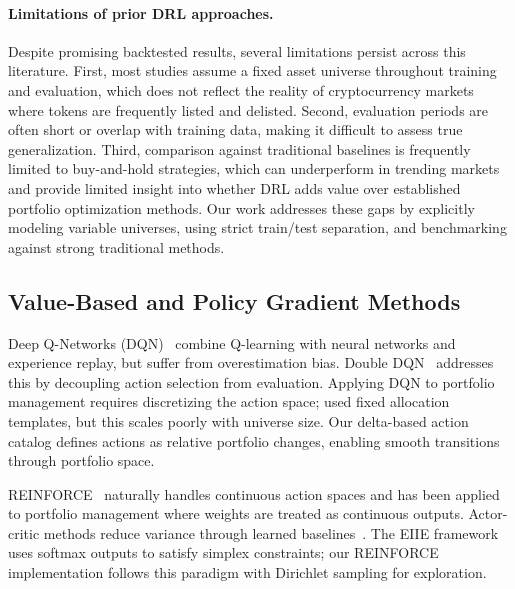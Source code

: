 \paragraph{Limitations of prior DRL approaches.} Despite promising backtested results, several limitations persist across this literature. First, most studies assume a fixed asset universe throughout training and evaluation, which does not reflect the reality of cryptocurrency markets where tokens are frequently listed and delisted. Second, evaluation periods are often short or overlap with training data, making it difficult to assess true generalization. Third, comparison against traditional baselines is frequently limited to buy-and-hold strategies, which can underperform in trending markets and provide limited insight into whether DRL adds value over established portfolio optimization methods. Our work addresses these gaps by explicitly modeling variable universes, using strict train/test separation, and benchmarking against strong traditional methods.

\subsection{Value-Based and Policy Gradient Methods}
\label{subsec:rl_methods}

Deep Q-Networks (DQN)~\citep{mnih2015dqn} combine Q-learning with neural networks and experience replay, but suffer from overestimation bias. Double DQN~\citep{vanHasselt2016ddqn} addresses this by decoupling action selection from evaluation. Applying DQN to portfolio management requires discretizing the action space; \citet{gao2020dqnportfolio} used fixed allocation templates, but this scales poorly with universe size. Our delta-based action catalog defines actions as relative portfolio changes, enabling smooth transitions through portfolio space.

REINFORCE~\citep{williams1992reinforce} naturally handles continuous action spaces and has been applied to portfolio management where weights are treated as continuous outputs. Actor-critic methods reduce variance through learned baselines~\citep{sutton1999policy, sadighian2019mmppo}. The EIIE framework~\citep{jiang2017eIIE} uses softmax outputs to satisfy simplex constraints; our REINFORCE implementation follows this paradigm with Dirichlet sampling for exploration.


